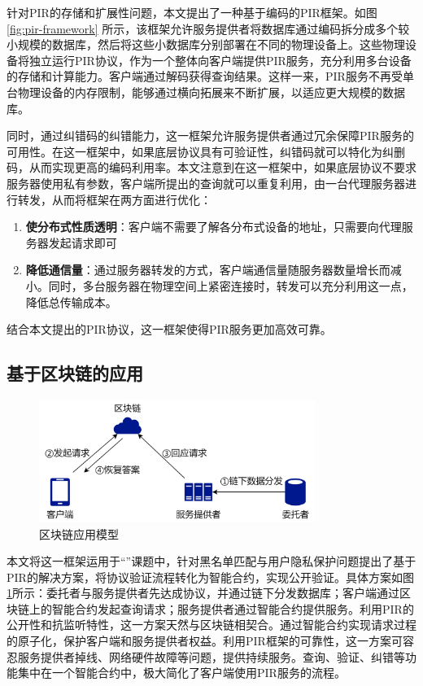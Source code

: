 针对PIR的存储和扩展性问题，本文提出了一种基于编码的PIR框架。如图 \ref{fig:pir-framework} 所示，该框架允许服务提供者将数据库通过编码拆分成多个较小规模的数据库，然后将这些小数据库分别部署在不同的物理设备上。这些物理设备将独立运行PIR协议，作为一个整体向客户端提供PIR服务，充分利用多台设备的存储和计算能力。客户端通过解码获得查询结果。这样一来，PIR服务不再受单台物理设备的内存限制，能够通过横向拓展来不断扩展，以适应更大规模的数据库。

同时，通过纠错码的纠错能力，这一框架允许服务提供者通过冗余保障PIR服务的可用性。在这一框架中，如果底层协议具有可验证性，纠错码就可以特化为纠删码，从而实现更高的编码利用率。本文注意到在这一框架中，如果底层协议不要求服务器使用私有参数，客户端所提出的查询就可以重复利用，由一台代理服务器进行转发，从而将框架在两方面进行优化：

\begin{enumerate}
    \item \textbf{使分布式性质透明}：客户端不需要了解各分布式设备的地址，只需要向代理服务器发起请求即可
    \item \textbf{降低通信量}：通过服务器转发的方式，客户端通信量随服务器数量增长而减小。同时，多台服务器在物理空间上紧密连接时，转发可以充分利用这一点，降低总传输成本。
\end{enumerate}

结合本文提出的PIR协议，这一框架使得PIR服务更加高效可靠。

\subsection{基于区块链的应用}

\begin{figure}
    \centering
    \includegraphics[width=0.8\textwidth]{figure/区块链应用模型.png}
    \caption{区块链应用模型}
    \label{fig:pir-application}
\end{figure}
本文将这一框架运用于“\projectname”课题中，针对黑名单匹配与用户隐私保护问题提出了基于PIR的解决方案，将协议验证流程转化为智能合约，实现公开验证。具体方案如图\ref{fig:pir-application}所示：委托者与服务提供者先达成协议，并通过链下分发数据库；客户端通过区块链上的智能合约发起查询请求；服务提供者通过智能合约提供服务。利用PIR的公开性和抗监听特性，这一方案天然与区块链相契合。通过智能合约实现请求过程的原子化，保护客户端和服务提供者权益。利用PIR框架的可靠性，这一方案可容忍服务提供者掉线、网络硬件故障等问题，提供持续服务。查询、验证、纠错等功能集中在一个智能合约中，极大简化了客户端使用PIR服务的流程。